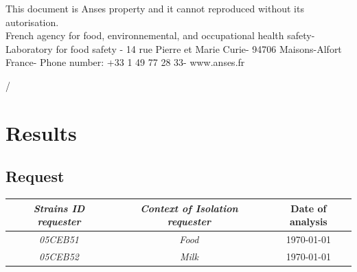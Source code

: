 \documentclass[a4paper]{article}
\begin{document}
\begin{titlepage}


This document is Anses property and it cannot reproduced without its autorisation.\\French agency for food, environnemental, and occupational health safety-Laboratory for food safety - 14 rue Pierre et Marie Curie- 94706 Maisons-Alfort France- Phone number: +33 1 49 77 28 33- www.anses.fr
\begin{flushright}
\thepage/\pageref{LastPage}
\end{flushright}

\vfill %




\end{titlepage}

\setcounter{page}{2}


\section{Results} 
\subsection{Request \\}

{\renewcommand{\arraystretch}{1.5} %
{\setlength{\tabcolsep}{1cm} %
\centering
\begin{tabular}{|c|c|c|}
  \hline
  \textbf{\textit{Strains ID requester}} & \textbf{\textit{Context of Isolation requester}} & \textbf{Date of analysis}\\
  \hline
  \textit{05CEB51} & \textit{Food} & \today\\%
  \textit{05CEB52} & \textit{Milk} & \today\\%
  \hline 
\end{tabular}\\[1cm]
}}
\end{document}
